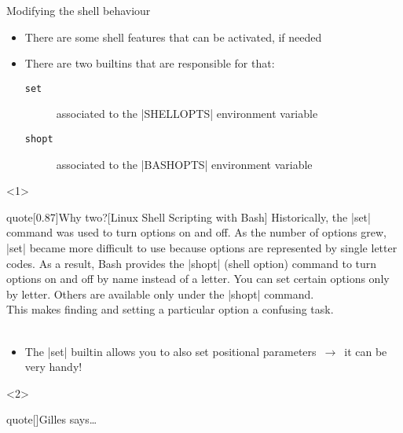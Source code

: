 
\begin{frame}{Modifying the shell behaviour}
    \vspace{-2mm}
    \begin{itemize}
        \item There are some shell features that can be activated, if needed
        \item There are two builtins that are responsible for that:
              \begin{description}
                  \item[\texttt{set}] associated to the \bash|SHELLOPTS| environment variable
                  \item[\texttt{shopt}] associated to the \bash|BASHOPTS| environment variable
              \end{description}
    \end{itemize}
    \begin{onlyenv}<1>
        \begin{varblock}{quote}[0.87\textwidth]{Why two?}[Linux Shell Scripting with Bash]
            Historically, the \textnormal{\bash|set|} command was used to turn options on and off.
            As the number of options grew, \textnormal{\bash|set|} became more difficult to use because options are represented by single letter codes.
            As a result, Bash provides the \textnormal{\bash|shopt|} (shell option) command to turn options on and off by name instead of a letter.
            You can set certain options only by letter.
            Others are available only under the \textnormal{\bash|shopt|} command.\\
            \alert{This makes finding and setting a particular option a confusing task.}\\[-0.5em] ~
        \end{varblock}
        \begin{itemize}
            \item The \bash|set| builtin allows you to also set positional parameters $\,\to\,$ it can be very handy!
        \end{itemize}
    \end{onlyenv}
    \begin{onlyenv}<2>
        \begin{varblock}{quote}[\textwidth]{Gilles says\ldots}

\end{varblock}
\end{onlyenv}
\end{frame}
